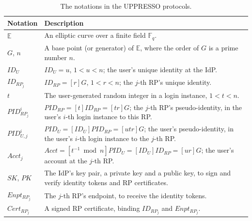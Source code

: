 \begin{table}[tb]
\footnotesize
    \caption{The notations in the UPPRESSO protocols.}
    \centering
    \begin{tabular}{|p{1.0cm}|p{6.60cm}|} \hline
    {\textbf{Notation}} & {\textbf{Description}} \\ \hline
    {$\mathbb{E}$} & {An elliptic curve over a finite field $\mathbb{F}_q$.} \\ \hline
    {$G$, $n$}&{A base point (or generator) of $\mathbb{E}$, where the order of $G$ is a prime number $n$.} \\ \hline
    {$ID_U$} & {$ID_U = u$, $1 < u < n$; the user's unique identity at the IdP.} \\ \hline
   {$ID_{RP_j}$} & {$ID_{RP} = [r]G$, $1 < r < n$; the $j$-th RP's unique identity.} \\ \hline
    {$t$} & {The user-generated random integer in a login instance, $1 < t < n$.} \\ \hline
    {$PID_{RP_j}^i$} & {$PID_{RP} = [t]{ID_{RP}} = [tr]G$; the $j$-th RP's pseudo-identity, in the user's $i$-th login instance to this RP.} \\ \hline
    {$PID_{U,j}^i$} & {$PID_U = [{ID_U}]{PID_{RP}} = [utr]G$; the user's pseudo-identity, in the user's $i$-th login instance to the $j$-th RP.} \\ \hline
     {$Acct_j$} & {$Acct = [t^{-1}\bmod n]PID_{U} = [ID_U]ID_{RP} = [ur]G$; the user's account at the $j$-th RP.} \\ \hline
    {$SK$, $PK$} & {The IdP's key pair, a private key and a public key, to sign and verify identity tokens and RP certificates.} \\ \hline
    {$Enpt_{RP_j}$} & {The $j$-th RP's endpoint, to receive the identity tokens.} \\ \hline
    {$Cert_{RP_j}$} & {A signed RP certificate, binding $ID_{RP_j}$ and $Enpt_{RP_j}$.} \\ \hline
    \end{tabular}
    \label{tbl:notations-protocol}
\end{table}


